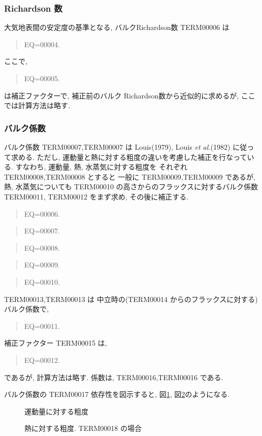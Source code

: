 \subsubsection{Richardson 数}

大気地表間の安定度の基準となる,
バルクRichardson数 TERM00006 は
%
\begin{quote}
EQ=00004.
\end{quote}
ここで, 
\begin{quote}
EQ=00005.
\end{quote}
は補正ファクターで, 補正前のバルク Richardson数から近似的に求めるが, 
ここでは計算方法は略す. 

\subsubsection{バルク係数}

バルク係数 TERM00007,TERM00007 は
Louis(1979), Louis {\em et al.}(1982) に従って求める. 
ただし, 運動量と熱に対する粗度の違いを考慮した補正を行なっている. 
すなわち, 運動量, 熱, 水蒸気に対する粗度を
それぞれ TERM00008,TERM00008 とすると
一般に TERM00009,TERM00009 であるが, 熱, 水蒸気についても
TERM00010 の高さからのフラックスに対するバルク係数
TERM00011, TERM00012 をまず求め, その後に補正する. 
%
\begin{quote}
EQ=00006.
\end{quote}
%
\begin{quote}
EQ=00007.
\end{quote}
\begin{quote}
EQ=00008.
\end{quote}
%
\begin{quote}
EQ=00009.
\end{quote}
\begin{quote}
EQ=00010.
\end{quote}

TERM00013,TERM00013 は
中立時の(TERM00014 からのフラックスに対する)バルク係数で,
%
\begin{quote}
EQ=00011.
\end{quote}

補正ファクター TERM00015 は, 
\begin{quote}
EQ=00012.
\end{quote}
であるが, 計算方法は略す. 
係数は, TERM00016,TERM00016 である. 

バルク係数の TERM00017 依存性を図示すると,
図\ref{p-sflx:cm}, 図\ref{p-sflx:ch}のようになる.

\begin{figure}[htbp]
  \begin{center}
    \caption{運動量に対する粗度}
    \label{p-sflx:cm}
  \end{center}
\end{figure}
\begin{figure}[htbp]
  \begin{center}
    \caption{熱に対する粗度. TERM00018 の場合}
    \label{p-sflx:ch}
  \end{center}
\end{figure}

